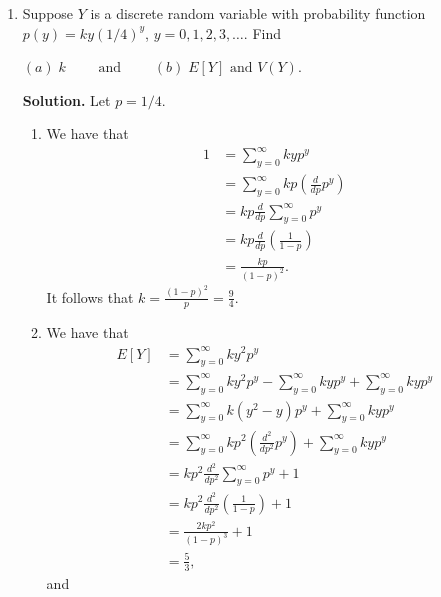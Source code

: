 \documentclass[9pt]{article}
\newcommand{\D}{\displaystyle}
\begin{document}
\begin{enumerate}
   \item Suppose $Y$ is a discrete random variable with probability function
         $p(y) = ky(1/4)^y$, $y = 0, 1, 2, 3, \ldots$. Find

         $(a)\;k \qquad \text{ and } \qquad (b)\;E[Y] \text{ and } V(Y)$.
         
      \textbf{Solution.} Let $p = 1/4$.
      
      \begin{enumerate}
         \item We have that
               \begin{align*}
                  1 &= \sum_{y=0}^\infty kyp^y \\
                    &= \sum_{y=0}^\infty kp\left(\frac{d}{dp}p^y\right) \\
                    &= kp\frac{d}{dp}\sum_{y=0}^\infty p^y \\
                    &= kp\frac{d}{dp}\left(\frac{1}{1 - p}\right) \\
                    &= \frac{kp}{(1 - p)^2}.
               \end{align*}
               It follows that $\D k = \frac{(1 - p)^2}{p} = \frac{9}{4}$.
         \item  We have that
               \begin{align*}
                  E[Y] &= \sum_{y=0}^\infty ky^2p^y \\
                       &= \sum_{y=0}^\infty ky^2p^y - \sum_{y=0}^\infty kyp^y
                          + \sum_{y=0}^\infty kyp^y    \\
                       &= \sum_{y=0}^\infty k(y^2-y)p^y +
                          \sum_{y=0}^\infty kyp^y    \\
                       &= \sum_{y=0}^\infty kp^2\left(\frac{d^2}{dp^2}p^y\right)
                          + \sum_{y=0}^\infty kyp^y \\
                       &= kp^2\frac{d^2}{dp^2}\sum_{y=0}^\infty p^y + 1 \\
                       &= kp^2\frac{d^2}{dp^2}\left(\frac{1}{1 - p}\right) + 1\\
                       &= \frac{2kp^2}{(1-p)^3} + 1 \\
                       &= \frac{5}{3},
               \end{align*}
               and
               \begin{align*}

\end{align*}
\end{enumerate}
\end{enumerate}
\end{document}
